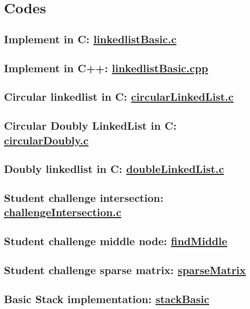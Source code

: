 \documentclass[11pt]{article}
\begin{document}
\section{Codes}
\label{sec:orga9faf18}
\subsection{Implement in C: \url{linkedlistBasic.c}}
\label{sec:org15c7456}
\subsection{Implement in C++: \url{linkedlistBasic.cpp}}
\label{sec:org430279c}
\subsection{Circular linkedlist in C: \url{circularLinkedList.c}}
\label{sec:orgc4f225e}
\subsection{Circular Doubly LinkedList in C: \url{circularDoubly.c}}
\label{sec:orga1bb137}
\subsection{Doubly linkedlist in C: \url{doubleLinkedList.c}}
\label{sec:org0a3748e}
\subsection{Student challenge intersection: \url{challengeIntersection.c}}
\label{sec:org170efd2}
\subsection{Student challenge middle node: \href{challengeMiddle.c}{findMiddle}}
\label{sec:orga82ad44}
\subsection{Student challenge sparse matrix: \href{challengeSparseMatrix.c}{sparseMatrix}}
\label{sec:org84c2f4a}
\subsection{Basic Stack implementation: \href{stackBasic.c}{stackBasic}}
\label{sec:orgee6b159}
\end{document}
